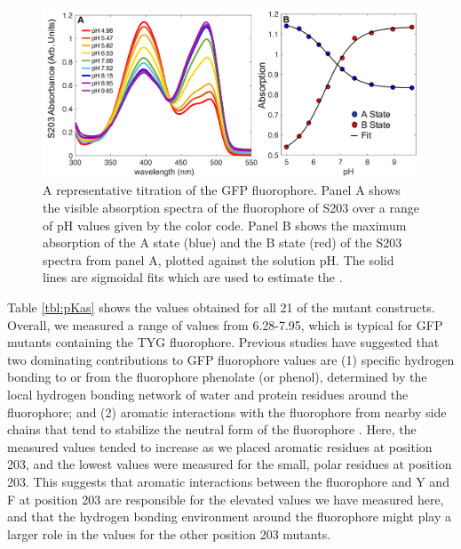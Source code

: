 \begin{figure}
    \center
    \includegraphics[width=\double]{figures-gfp-pKa/absorption_titrations.png}
    \caption[Representative titration of the GFP fluorophore]{
        A representative titration of the GFP fluorophore. 
        Panel A shows the visible absorption spectra of the fluorophore of S203 over a range of pH values given by the color code. 
        Panel B shows the maximum absorption of the A state (blue) and the B state (red) of the S203 spectra from panel A, plotted against the solution pH. 
        The solid lines are sigmoidal fits which are used to estimate the \pKa{}.
    }
    \label{fig:abs_titrations}
\end{figure}

Table \ref{tbl:pKas} shows the \pKa{} values obtained for all 21 of the mutant constructs.
Overall, we measured a range of \pKa{} values from 6.28-7.95, which is typical for GFP mutants containing the TYG fluorophore.
Previous studies have suggested that two dominating contributions to GFP fluorophore \pKa{} values are (1) specific hydrogen bonding to or from the fluorophore phenolate (or phenol), determined by the local hydrogen bonding network of water and protein residues around the fluorophore; and (2) aromatic interactions with the fluorophore from nearby side chains that tend to stabilize the neutral form of the fluorophore \cite{Elsliger1999, Wachter1998}.
Here, the measured \pKa{} values tended to increase as we placed aromatic residues at position 203, and the lowest \pKa{} values were measured for the small, polar residues at position 203.
This suggests that aromatic interactions between the fluorophore and Y and F at position 203 are responsible for the elevated \pKa{} values we have measured here, and that the hydrogen bonding environment around the fluorophore might play a larger role in the \pKa{} values for the other position 203 mutants. 

